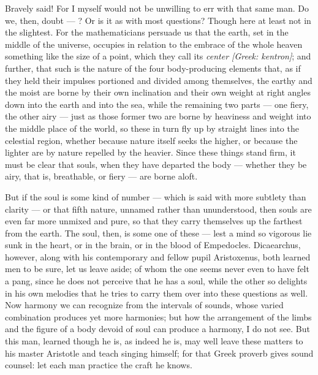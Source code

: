  Bravely said! For I myself would not be unwilling to err with that same man. Do we, then, doubt — ? Or is it as with most questions? Though here at least not in the slightest. For the mathematicians persuade us that the earth, set in the middle of the universe, occupies in relation to the embrace of the whole heaven something like the size of a point, which they call its \textit{center [Greek: kentron]}; and further, that such is the nature of the four body-producing elements that, as if they held their impulses portioned and divided among themselves, the earthy and the moist are borne by their own inclination and their own weight at right angles down into the earth and into the sea, while the remaining two parts — one fiery, the other airy — just as those former two are borne by heaviness and weight into the middle place of the world, so these in turn fly up by straight lines into the celestial region, whether because nature itself seeks the higher, or because the lighter are by nature repelled by the heavier. Since these things stand firm, it must be clear that souls, when they have departed the body — whether they be airy, that is, breathable, or fiery — are borne aloft.

 But if the soul is some kind of number — which is said with more subtlety than clarity — or that fifth nature, unnamed rather than ununderstood, then souls are even far more unmixed and pure, so that they carry themselves up the farthest from the earth. The soul, then, is some one of these — lest a mind so vigorous lie sunk in the heart, or in the brain, or in the blood of Empedocles. Dicaearchus, however, along with his contemporary and fellow pupil Aristoxenus, both learned men to be sure, let us leave aside; of whom the one seems never even to have felt a pang, since he does not perceive that he has a soul, while the other so delights in his own melodies that he tries to carry them over into these questions as well. Now harmony we can recognize from the intervals of sounds, whose varied combination produces yet more harmonies; but how the arrangement of the limbs and the figure of a body devoid of soul can produce a harmony, I do not see. But this man, learned though he is, as indeed he is, may well leave these matters to his master Aristotle and teach singing himself; for that Greek proverb gives sound counsel: let each man practice the craft he knows.

